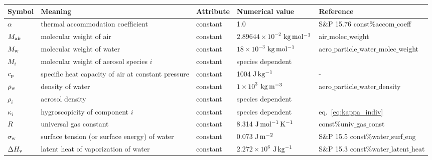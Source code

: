 \documentclass{article}
\begin{document}
\vspace{2cm}
\begin{tabular}{p{1cm} p{4cm} p{1.5cm} l l} 
\hline Symbol & Meaning  &  Attribute  & Numerical value &  Reference    \\
\hline             
$\alpha$   &  thermal accommodation coefficient   & constant   & 1.0 & S$\&$P 15.76  const$\%$accom$\_$coeff \\
$M_{\rm air} $      &  molecular weight of air  &   constant  & $2.89644 \times 10^{-2} $  $\rm{kg \,mol^{-1}}$ &  air$\_$molec$\_$weight   \\
$M_{\rm w} $    &  molecular weight of water  &  constant & $18\times10^{-3}$ $\rm{kg \, mol^{-1}}  $  &  aero$\_$particle$\_$water$\_$molec$\_$weight    \\
$M_i $      &  molecular weight of aerosol species $i$  &   constant  & species dependent &    \\
$c_{\rm p}$       &  specific heat capacity of air at constant pressure  & constant & 1004 $\rm{J \, kg^{-1}}$ & -     \\
$\rho_{\rm w}$ &  density of water & constant  & $1\times10^{3}$ $\rm{kg \, m^{-3}}  $ &   aero$\_$particle$\_$water$\_$density \\ 
$ \rho_i$    &  aerosol density  &  constant  & species dependent  &     \\
$\kappa_i$      &  hygroscopicity of component $i$   &  constant & species dependent  &  eq.~\ref{eq:kappa_indiv}   \\
$R$     &  universal gas constant  &  constant   & 8.314 $\rm{J \, mol^{-1}\, K^{-1}}$   &  const$\%$univ$\_$gas$\_$const \\
$\sigma_{\rm w}$     &  surface tension (or surface energy) of water  &  constant  & 0.073 $\rm{J \, m^{-2}}$ & S$\&$P 15.5  const$\%$water$\_$surf$\_$eng  \\                                        
$\Delta H_{\rm  v}$  & latent heat of vaporization of water   &  constant  & $2.272\times10^{6}$ $\rm{J \, kg^{-1}}$ &  S$\&$P 15.3 const$\%$water$\_$latent$\_$heat \\ 


\end{tabular}
\end{document}
